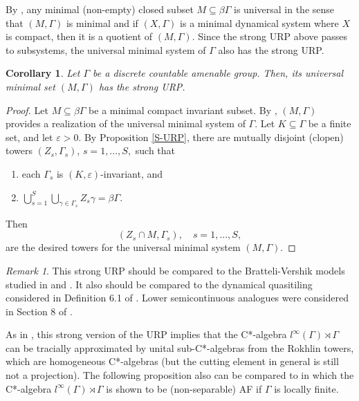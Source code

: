 \documentclass[12pt, oneside, psamsfonts]{amsart}
\newtheorem{cor}[thm]{Corollary}
\theoremstyle{definition}
\theoremstyle{remark}
\newtheorem{rem}[thm]{Remark}
\numberwithin{equation}{section}
\newcommand{\eps}{\varepsilon}
\begin{document}
By \cite{Ellis_1960}, any minimal (non-empty) closed subset $M \subseteq \beta\Gamma$ is universal in the sense that $(M, \Gamma)$ is minimal and if $(X, \Gamma)$ is a minimal dynamical system where $X$ is compact, then it is a quotient of $(M, \Gamma)$. Since the strong URP above passes to subsystems, the universal minimal system of $\Gamma$ also has the strong URP. 
\begin{cor}\label{S-URP-M}
Let $\Gamma$ be a discrete countable amenable group. Then, its universal minimal set $(M, \Gamma)$ has the strong URP.
\end{cor}
\begin{proof}
Let $M \subseteq \beta\Gamma$ be a minimal compact invariant subset. By \cite{Ellis_1960}, $(M, \Gamma)$ provides a realization of the universal minimal system of $\Gamma$. Let $K \subseteq \Gamma$ be a finite set, and let $\eps>0$. By Proposition \ref{S-URP}, there are mutually disjoint (clopen) towers $(Z_s, \Gamma_s)$, $s=1, ..., S,$
such that
\begin{enumerate}
\item each $\Gamma_s$ is $(K, \eps)$-invariant, and
\item $\bigcup_{s=1}^S \bigcup_{\gamma \in \Gamma_s} Z_s\gamma = \beta\Gamma$.
\end{enumerate}
Then $$(Z_s \cap M, \Gamma_s), \quad s=1, ..., S, $$ are the desired towers for the universal minimal system $(M, \Gamma)$.
\end{proof}


\begin{rem}
This  strong URP should be compared to the Bratteli-Vershik models studied in \cite{Put-PJM} and \cite{HPS-Cantor}. It also should be compared to the dynamical quasitiling considered in Definition 6.1 of \cite{DZ-comparison}. %
Lower semicontinuous analogues were considered in Section 8 of \cite{Niu-MD-Z}.  
\end{rem}

As in \cite{Niu-MD-Z}, this strong version of the URP implies  that the C*-algebra $l^\infty(\Gamma) \rtimes \Gamma$ can be tracially approximated by unital sub-C*-algebras from the Rokhlin towers, which are homogeneous C*-algebras (but the cutting element in general is still not a projection). The following proposition also can be compared to \cite{Li_2018} in which the C*-algebra  $l^\infty(\Gamma) \rtimes \Gamma$ is shown to be (non-separable) AF if $\Gamma$ is locally finite.
\end{document}
